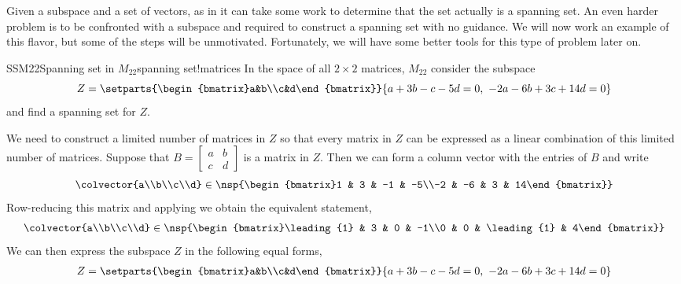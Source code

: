 %
Given a subspace and a set of vectors, as in  it can take some work to determine that the set actually is a spanning set.  An even harder problem is to be confronted with a subspace and required to construct a spanning set with no guidance.  We will now work  an example of this flavor, but some of the steps will be unmotivated.  Fortunately, we will have some better tools for this type of problem later on.
%
\begin{example}{SSM22}{Spanning set in $M_{22}$}{spanning set!matrices}
In the space of all $2\times 2$ matrices, $M_{22}$ consider the subspace
%
\begin{equation*}
Z=\setparts{\begin{bmatrix}a&b\\c&d\end{bmatrix}}{a+3b-c-5d=0,\ -2a-6b+3c+14d=0}
\end{equation*}
%
and find a spanning set for $Z$.\par
%
We need to construct a limited number of matrices in $Z$ so that every matrix in $Z$ can be expressed as a linear combination of this limited number of matrices.  Suppose that $B=\begin{bmatrix}a&b\\c&d\end{bmatrix}$ is a matrix in $Z$.  Then we can form a column vector with the entries of $B$ and write
%
\begin{equation*}
\colvector{a\\b\\c\\d}\in
\nsp{\begin{bmatrix}1 & 3 & -1 & -5\\-2 & -6 & 3 & 14\end{bmatrix}}
\end{equation*}
%
Row-reducing this matrix and applying  we obtain the equivalent statement,
%
\begin{equation*}
\colvector{a\\b\\c\\d}\in
\nsp{\begin{bmatrix}\leading{1} & 3 & 0 & -1\\0 & 0 & \leading{1} & 4\end{bmatrix}}
\end{equation*}
%
We can then express the subspace $Z$ in the following equal forms,
%
\begin{align*}
Z&=\setparts{\begin{bmatrix}a&b\\c&d\end{bmatrix}}{a+3b-c-5d=0,\ -2a-6b+3c+14d=0}\\

\end{align*}
\end{example}
